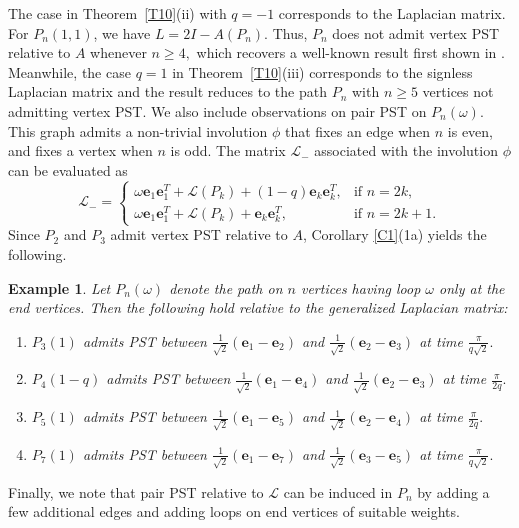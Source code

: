\documentclass[12pt,a4paper]{article}
\newtheorem{exm}{Example}
\def \e {{\mathbf e}}
\newcommand{\ob}[1]{\left(#1\right)}
\begin{document}
The case in Theorem~\ref{T10}(ii) with $q=-1$ corresponds to the Laplacian matrix. For $P_n(1,1)$, we have $L = 2I - A(P_n)$. Thus, $P_n$ does not admit vertex PST relative to $A$ whenever $n \geq 4,$ which recovers a well-known result first shown in \cite{christandl}. Meanwhile, the case $q=1$ in Theorem~\ref{T10}(iii) corresponds to the signless Laplacian matrix and the result reduces to the path $P_n$ with $n \geq 5$ vertices not admitting vertex PST.
We also include observations on pair PST on  $P_n(\omega)$. This graph admits a non-trivial involution $\phi$ that fixes an edge when $n$ is even, and fixes a vertex when $n$ is odd. The matrix $\mathscr{L}_-$ associated with the involution $\phi$ can be evaluated as 
$$\mathscr{L}_{-} =\begin{cases}
    \omega\e_1\e_1^T+\mathscr{L}(P_k)+(1-q)\e_k\e_k^T, & \text{if } n=2k,\\
    \omega\e_1\e_1^T+\mathscr{L}(P_k)+\e_k\e_k^T, &\text{if } n=2k+1.
\end{cases}$$
Since $P_2$ and $P_3$ admit vertex PST relative to $A$, Corollary \ref{C1}(1a) yields the following.
\begin{exm}\label{Ex2}
Let $P_n(\omega)$ denote the path on $n$ vertices having loop $\omega$ only at the end vertices. Then the following hold relative to the generalized Laplacian matrix:
\begin{enumerate}
\item $P_3(1)$ admits PST between $\frac{1}{\sqrt{2}}(\e_1-\e_2)$ and $\frac{1}{\sqrt{2}}(\e_2-\e_3)$ at time $\frac{\pi}{q\sqrt{2}}.$ 
\item $P_4\ob{1-q}$ admits PST between $\frac{1}{\sqrt{2}}(\e_1-\e_4)$ and $\frac{1}{\sqrt{2}}(\e_2-\e_3)$ at time $\frac{\pi}{2q}.$
\item $P_5(1)$ admits PST between $\frac{1}{\sqrt{2}}(\e_1-\e_5)$ and $\frac{1}{\sqrt{2}}(\e_2-\e_4)$ at time $\frac{\pi}{2q}.$
\item $P_7(1)$ admits PST between $\frac{1}{\sqrt{2}}(\e_1-\e_7)$ and $\frac{1}{\sqrt{2}}(\e_3-\e_5)$ at time $\frac{\pi}{q\sqrt{2}}.$
\end{enumerate}
\end{exm}

Finally, we note that pair PST relative to $\mathscr{L}$ can be induced in $P_n$ by adding a few additional edges and adding loops on end vertices of suitable weights. 
\end{document}
